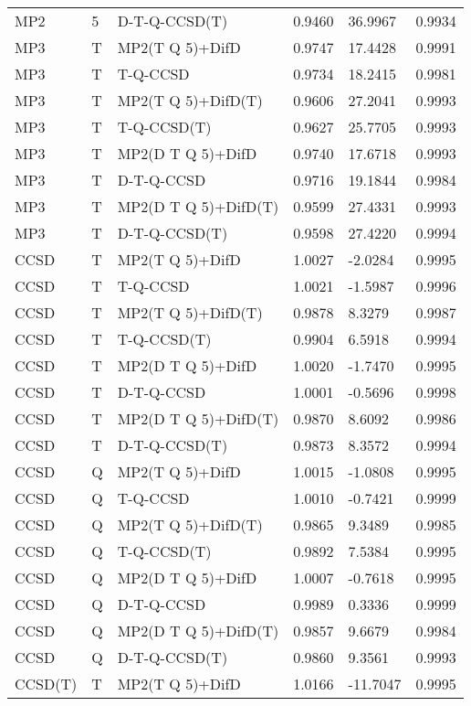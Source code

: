 \begin{table}
\begin{tabular}{l l l l l l }
    MP2 & 5 & D-T-Q-CCSD(T) & 0.9460 & 36.9967 & 0.9934 \\ 
    MP3 & T & MP2(T Q 5)+DifD & 0.9747 & 17.4428 & 0.9991 \\ 
    MP3 & T & T-Q-CCSD & 0.9734 & 18.2415 & 0.9981 \\ 
    MP3 & T & MP2(T Q 5)+DifD(T) & 0.9606 & 27.2041 & 0.9993 \\ 
    MP3 & T & T-Q-CCSD(T) & 0.9627 & 25.7705 & 0.9993 \\ 
    MP3 & T & MP2(D T Q 5)+DifD & 0.9740 & 17.6718 & 0.9993 \\ 
    MP3 & T & D-T-Q-CCSD & 0.9716 & 19.1844 & 0.9984 \\ 
    MP3 & T & MP2(D T Q 5)+DifD(T) & 0.9599 & 27.4331 & 0.9993 \\ 
    MP3 & T & D-T-Q-CCSD(T) & 0.9598 & 27.4220 & 0.9994 \\ 
    CCSD & T & MP2(T Q 5)+DifD & 1.0027 & -2.0284 & 0.9995 \\ 
    CCSD & T & T-Q-CCSD & 1.0021 & -1.5987 & 0.9996 \\ 
    CCSD & T & MP2(T Q 5)+DifD(T) & 0.9878 & 8.3279 & 0.9987 \\ 
    CCSD & T & T-Q-CCSD(T) & 0.9904 & 6.5918 & 0.9994 \\ 
    CCSD & T & MP2(D T Q 5)+DifD & 1.0020 & -1.7470 & 0.9995 \\ 
    CCSD & T & D-T-Q-CCSD & 1.0001 & -0.5696 & 0.9998 \\ 
    CCSD & T & MP2(D T Q 5)+DifD(T) & 0.9870 & 8.6092 & 0.9986 \\ 
    CCSD & T & D-T-Q-CCSD(T) & 0.9873 & 8.3572 & 0.9994 \\ 
    CCSD & Q & MP2(T Q 5)+DifD & 1.0015 & -1.0808 & 0.9995 \\ 
    CCSD & Q & T-Q-CCSD & 1.0010 & -0.7421 & 0.9999 \\ 
    CCSD & Q & MP2(T Q 5)+DifD(T) & 0.9865 & 9.3489 & 0.9985 \\ 
    CCSD & Q & T-Q-CCSD(T) & 0.9892 & 7.5384 & 0.9995 \\ 
    CCSD & Q & MP2(D T Q 5)+DifD & 1.0007 & -0.7618 & 0.9995 \\ 
    CCSD & Q & D-T-Q-CCSD & 0.9989 & 0.3336 & 0.9999 \\ 
    CCSD & Q & MP2(D T Q 5)+DifD(T) & 0.9857 & 9.6679 & 0.9984 \\ 
    CCSD & Q & D-T-Q-CCSD(T) & 0.9860 & 9.3561 & 0.9993 \\ 
    CCSD(T) & T & MP2(T Q 5)+DifD & 1.0166 & -11.7047 & 0.9995 \\ 

\end{tabular}
\end{table}
